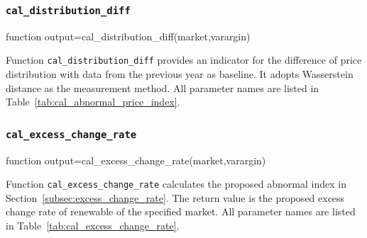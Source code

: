 \documentclass[10pt]{article}
\numberwithin{equation}{section}
\numberwithin{table}{section}
\numberwithin{figure}{section}
\begin{document}
\subsubsection{\texttt{cal\_distribution\_diff}}\label{func:cal_distribution_diff}

\begin{Code}
function output=cal_distribution_diff(market,varargin)
\end{Code}

Function \verb!cal_distribution_diff! provides an indicator for the difference of price distribution with data from the previous year as baseline. It adopts Wasserstein distance as the measurement method. All parameter names are listed in Table~\ref{tab:cal_abnormal_price_index}.



\subsubsection{\texttt{cal\_excess\_change\_rate}}\label{func:cal_excess_change_rate}

\begin{Code}
function output=cal_excess_change_rate(market,varargin)
\end{Code}

Function \verb!cal_excess_change_rate! calculates the proposed abnormal index in Section~\ref{subsec:excess_change_rate}. The return value is the proposed excess change rate of renewable of the specified market. All parameter names are listed in Table~\ref{tab:cal_excess_change_rate}.
\end{document}
